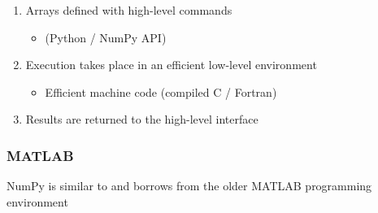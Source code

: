 \begin{frame}
    
    \begin{enumerate}
        \item Arrays defined with high-level commands 
        \vspace{0.5em}
        \begin{itemize}
            \item (Python / NumPy API)
        \end{itemize}
        \vspace{0.5em}
        \item Execution takes place in an efficient low-level environment
        \vspace{0.5em}
        \begin{itemize}
            \item Efficient machine code (compiled C / Fortran)
        \end{itemize}
        \vspace{0.5em}
        \item Results are returned to the high-level interface
    \end{enumerate}

\end{frame}


\begin{frame}
    \frametitle{MATLAB}

    NumPy is similar to and borrows from the older MATLAB programming
    environment

    \vspace{0.5em}
    \vspace{0.5em}
    \begin{figure}
       \begin{center} %
       \end{center}
    \end{figure}


\end{frame}


